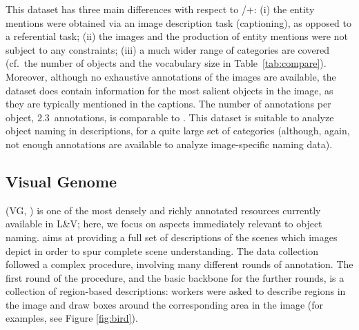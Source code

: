 This dataset has three main differences with respect to /+: (i) the entity mentions were obtained via an image description task (captioning), as opposed to a referential task; (ii) the images and the production of entity mentions were not subject to any constraints; (iii) a much wider range of categories are covered (cf.\ the number of objects and the vocabulary size in Table\ \ref{tab:compare}). %
Moreover, although no exhaustive annotations of the images are available, the dataset does contain information for the most salient objects in the image, as they are typically mentioned in the captions.
The number of annotations per object, $2.3$\ annotations, is comparable to .
This dataset is suitable to analyze object naming in descriptions, for a quite large set of categories (although, again, not enough annotations are available to analyze image-specific naming data).


\subsection{Visual Genome}
\label{sec:vg-survey}

\vgenome (VG, ) is one of the most densely and richly annotated resources currently available in L\&V; here, we focus on aspects immediately relevant to object naming.
\vg aims at providing a full set of descriptions of the scenes which images depict in order to spur complete scene understanding. 
The data collection followed a complex procedure, involving many different rounds of annotation.
The first round of the procedure, and the basic backbone for the further rounds, is a collection of region-based descriptions: workers were asked to describe regions in the image and draw boxes around the corresponding area in the image (for examples, see Figure \ref{fig:bird}).

